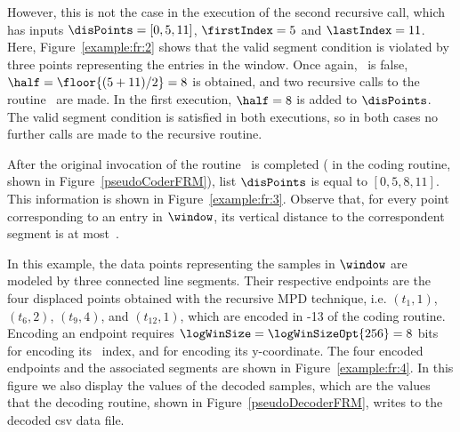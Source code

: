 \clearpage




However, this is not the case in the execution of the second recursive call, which has inputs $\disPoints=[0, 5, 11]$, $\firstIndex = 5$ and $\lastIndex = 11$. Here, Figure~\ref{example:fr:2} shows that the valid segment condition is violated by three points representing the entries in the window. Once again, \validSegment\ is false, $\half=\floor{(5 + 11) / 2}=8$ is obtained, and two recursive calls to the routine \getDisplacedPointsMethod\ are made. In the first execution, $\half=8$ is added to $\disPoints$. The valid segment condition is satisfied in both executions, so in both cases no further calls are made to the recursive routine. 


After the original invocation of the routine \getDisplacedPointsMethod\ is completed ( in the coding routine, shown in Figure~\ref{pseudoCoderFRM}), list $\disPoints$ is equal to $[0, 5, 8, 11]$. This information is shown in Figure~\ref{example:fr:3}. Observe that, for every point corresponding to an entry in $\window$, its vertical distance to the correspondent segment is at most~\maxerror.


\vspace{+5pt}


\clearpage


In this example, the data points representing the samples in $\window$ are modeled by three connected line segments. Their respective endpoints are the four displaced points obtained with the recursive MPD technique, i.e. $(t_1, 1)$, $(t_6, 2)$, $(t_9, 4)$, and $(t_{12}, 1)$, which are encoded in -13 of the coding routine. Encoding an endpoint requires $\logWinSize = \logWinSizeOpt{256}=8$ bits for encoding its \window\ index, and \tobitexp for encoding its y-coordinate. The four encoded endpoints and the associated segments are shown in Figure~\ref{example:fr:4}. In this figure we also display the values of the decoded samples, which are the values that the decoding routine, shown in Figure~\ref{pseudoDecoderFRM}, writes to the decoded csv data file. 


\vspace{+5pt}


\clearpage

